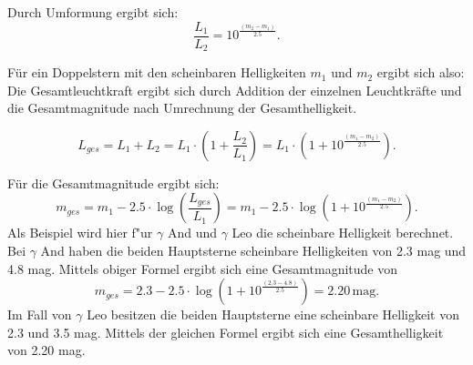 Durch Umformung ergibt sich: 
\begin{equation}
\frac{L_1}{L_2} = 10^{\frac{(m_2 - m_1)}{2.5}}. 
\end{equation}

Für ein Doppelstern mit den scheinbaren Helligkeiten $m_1$ und $m_2$ ergibt sich also: 
Die Gesamtleuchtkraft ergibt sich durch Addition der einzelnen Leuchtkräfte und die Gesamtmagnitude nach Umrechnung der Gesamthelligkeit. 

\begin{equation}
L_{ges} = L_1 + L_2 = L_1 \cdot (1 + \frac{L_2}{L_1}) = L_1 \cdot (1 + 10^{\frac{(m_1 - m_2)}{2.5}}). 
\end{equation}

Für die Gesamtmagnitude ergibt sich:
\begin{equation}
m_{ges} = m_1 - 2.5\cdot \log(\frac{L_{ges}}{L_1}) = m_1 - 2.5\cdot \log(1 + 10^{\frac{(m_1 - m_2)}{2.5}}).
\end{equation}
Als Beispiel wird hier f"ur $\gamma$ And und $\gamma$ Leo die scheinbare Helligkeit berechnet. 
Bei $\gamma$ And haben die beiden Hauptsterne scheinbare Helligkeiten von 2.3 mag und 4.8 mag. Mittels obiger Formel ergibt sich eine Gesamtmagnitude von 
\begin{equation}
m_{ges} = 2.3 - 2.5\cdot \log(1 + 10^{\frac{(2.3 - 4.8)}{2.5}}) = 2.20 \, \mathrm{mag}.
\end{equation}
Im Fall von $\gamma$ Leo besitzen die beiden Hauptsterne eine scheinbare Helligkeit von 2.3 und 3.5 mag. Mittels der gleichen Formel ergibt sich eine Gesamthelligkeit von 2.20 mag. \\

